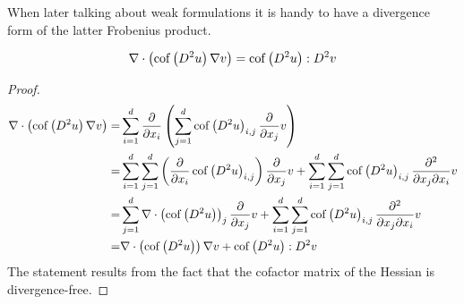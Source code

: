 When later talking about weak formulations it is handy to have a divergence form of the latter Frobenius product.
\begin{lemma} \label{la: An application of the divergernce product rule}
\[
		\nabla \cdot \left( \mycof {D^2 u } \nabla v \right) %
		= \mycof {D^2 u}: D^2 v
\] 
\end{lemma}

\begin{proof}
\begin{align*}
\nabla \cdot \left( \mycof {D^2 u } \nabla v \right) =&%
\sum_{i= 1}^{d} \dx {x_i} 	\left( \sum_{j= 1}^{d} \mycof {D^2 u }_{i,j} \dx{x_j} v \right)\\
=&  \sum_{i= 1}^{d} \sum_{j= 1}^{d}  \left(\dx {x_i} \mycof {D^2 u }_{i,j}  \right) \dx{x_j}v + \sum_{i= 1}^{d} \sum_{j= 1}^{d}  \mycof {D^2 u }_{i,j} \dxy{x_j}{x_i}v\\
=&  \sum_{j= 1}^{d}  \nabla \cdot \left(\mycof {D^2 u }\right)_j \dx{x_j}v + \sum_{i= 1}^{d} \sum_{j= 1}^{d}  \mycof {D^2 u }_{i,j} \dxy{x_j}{x_i}v\\
=&   \nabla \cdot \left(\mycof {D^2 u }\right) \nabla v+ \mycof {D^2 u }:D^2v
\end{align*}
The statement results from the fact that the cofactor matrix of the Hessian is divergence-free.
\end{proof}
